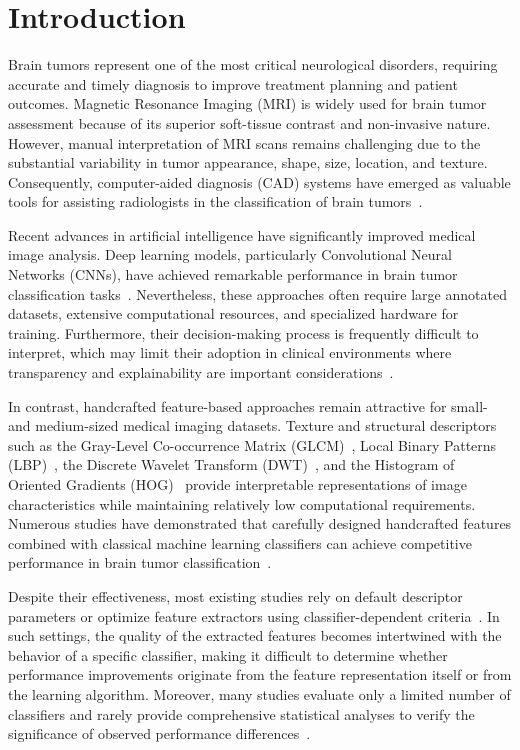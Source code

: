\section{Introduction}
\label{sec:introduction}

Brain tumors represent one of the most critical neurological disorders,
requiring accurate and timely diagnosis to improve treatment planning and
patient outcomes. Magnetic Resonance Imaging (MRI) is widely used for brain
tumor assessment because of its superior soft-tissue contrast and
non-invasive nature. However, manual interpretation of MRI scans remains
challenging due to the substantial variability in tumor appearance, shape,
size, location, and texture. Consequently, computer-aided diagnosis (CAD)
systems have emerged as valuable tools for assisting radiologists in the
classification of brain tumors~\cite{ottoni2025}.

Recent advances in artificial intelligence have significantly improved
medical image analysis. Deep learning models, particularly Convolutional
Neural Networks (CNNs), have achieved remarkable performance in brain tumor
classification tasks~\cite{ottoni2025}. Nevertheless, these approaches often
require large annotated datasets, extensive computational resources, and
specialized hardware for training. Furthermore, their decision-making
process is frequently difficult to interpret, which may limit their adoption
in clinical environments where transparency and explainability are important
considerations~\cite{ottoni2025}.

In contrast, handcrafted feature-based approaches remain attractive for
small- and medium-sized medical imaging datasets. Texture and structural
descriptors such as the Gray-Level Co-occurrence Matrix
(GLCM)~\cite{haralick1973}, Local Binary Patterns (LBP)~\cite{ojala2002},
the Discrete Wavelet Transform (DWT)~\cite{mallat1989}, and the Histogram of
Oriented Gradients (HOG)~\cite{dalal2005} provide interpretable
representations of image characteristics while maintaining relatively low
computational requirements. Numerous studies have demonstrated that
carefully designed handcrafted features combined with classical machine
learning classifiers can achieve competitive performance in brain tumor
classification~\cite{pattanaik2022,dheepak2024,nawaz2022,basthikodi2024}.

Despite their effectiveness, most existing studies rely on default descriptor
parameters or optimize feature extractors using classifier-dependent
criteria~\cite{pattanaik2022,dheepak2024,basthikodi2024}. In such settings,
the quality of the extracted features becomes intertwined with the behavior
of a specific classifier, making it difficult to determine whether
performance improvements originate from the feature representation itself or
from the learning algorithm. Moreover, many studies evaluate only a limited
number of classifiers and rarely provide comprehensive statistical analyses
to verify the significance of observed performance
differences~\cite{pattanaik2022,ottoni2025}.


